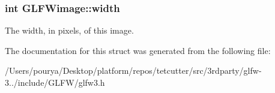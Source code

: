 \subsubsection[{width}]{\setlength{\rightskip}{0pt plus 5cm}int G\+L\+F\+Wimage\+::width}\label{structGLFWimage_af6a71cc999fe6d3aea31dd7e9687d835}
The width, in pixels, of this image. 

The documentation for this struct was generated from the following file\+:\begin{DoxyCompactItemize}
\item 
/\+Users/pourya/\+Desktop/platform/repos/tetcutter/src/3rdparty/glfw-\/3../include/\+G\+L\+F\+W/glfw3.\+h\end{DoxyCompactItemize}
